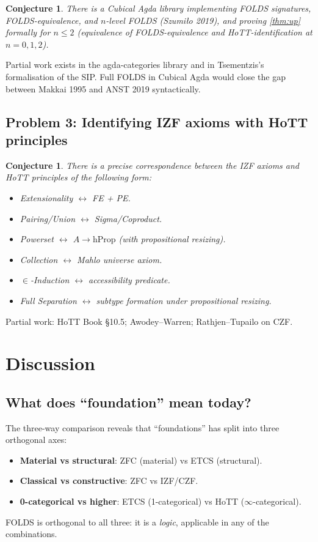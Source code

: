 \documentclass[12pt]{article}
\newtheorem{conjecture}[theorem]{Conjecture}
\theoremstyle{definition}
\theoremstyle{remark}
\begin{document}
\begin{conjecture}
\label{conj:cubicalfolds}
There is a Cubical Agda library implementing FOLDS signatures, FOLDS-equivalence, and
$n$-level FOLDS (Szumi\l{}o 2019), and proving \cref{thm:up} formally for $n\le 2$
(equivalence of FOLDS-equivalence and HoTT-identification at $n=0,1,2$).
\end{conjecture}

\noindent Partial work exists in the agda-categories library and in Tsementzis's
formalisation of the SIP. Full FOLDS in Cubical Agda would close the gap between Makkai
1995 and ANST 2019 syntactically.

\subsection{Problem 3: Identifying IZF axioms with HoTT principles}

\begin{conjecture}
\label{conj:izfhott}
There is a precise correspondence between the IZF axioms and HoTT principles of the
following form:
\begin{itemize}
\item Extensionality $\leftrightarrow$ FE + PE.
\item Pairing/Union $\leftrightarrow$ Sigma/Coproduct.
\item Powerset $\leftrightarrow$ $A\to\mathrm{hProp}$ (with propositional resizing).
\item Collection $\leftrightarrow$ Mahlo universe axiom.
\item $\in$-Induction $\leftrightarrow$ accessibility predicate.
\item Full Separation $\leftrightarrow$ subtype formation under propositional resizing.
\end{itemize}
\end{conjecture}

\noindent Partial work: HoTT Book \S10.5; Awodey--Warren; Rathjen--Tupailo on CZF.

\section{Discussion}
\label{sec:discussion}

\subsection{What does ``foundation'' mean today?}

The three-way comparison reveals that ``foundations'' has split into three orthogonal
axes:
\begin{itemize}
\item \textbf{Material vs structural}: ZFC (material) vs ETCS (structural).
\item \textbf{Classical vs constructive}: ZFC vs IZF/CZF.
\item \textbf{0-categorical vs higher}: ETCS (1-categorical) vs HoTT ($\infty$-categorical).
\end{itemize}
FOLDS is orthogonal to all three: it is a \emph{logic}, applicable in any of the
combinations.
\end{document}
